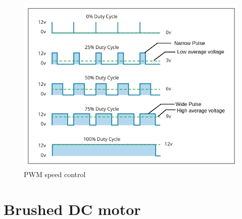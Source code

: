 \begin{figure}[h!]
\centering
\includegraphics[width=12cm]{./Figures/PWM_speed_control.png}
\caption{PWM speed control}
\label{BLDC_runner}
\end{figure}

\section{Brushed DC motor}

